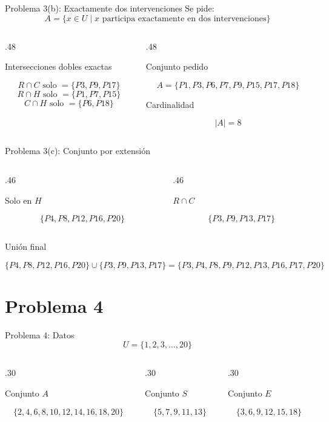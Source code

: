 \documentclass[aspectratio=169,11pt]{beamer}
\newcommand{\BloqueVisual}[2]{
	\begin{block}{#1}
		#2
	\end{block}
}
\begin{document}
	\begin{frame}{Problema 3(b): Exactamente dos intervenciones}
		Se pide:
		\[
		A=\{x\in U \mid x \text{ participa exactamente en dos intervenciones}\}
		\]
		
		\begin{columns}[T]
			\begin{column}{.48\textwidth}
				\BloqueVisual{Intersecciones dobles exactas}{
					\[
					R\cap C \text{ solo }=\{P3,P9,P17\}
					\]
					\[
					R\cap H \text{ solo }=\{P1,P7,P15\}
					\]
					\[
					C\cap H \text{ solo }=\{P6,P18\}
					\]
				}
			\end{column}
			\begin{column}{.48\textwidth}
				\BloqueVisual{Conjunto pedido}{
					\[
					A=\{P1,P3,P6,P7,P9,P15,P17,P18\}
					\]
				}
				\BloqueVisual{Cardinalidad}{
					\[
					|A|=8
					\]
				}
			\end{column}
		\end{columns}
	\end{frame}
	
	\begin{frame}{Problema 3(c): Conjunto por extensión}
		\begin{columns}[T]
			\begin{column}{.46\textwidth}
				\BloqueVisual{Solo en \(H\)}{
					\[
					\{P4,P8,P12,P16,P20\}
					\]
				}
			\end{column}
			\begin{column}{.46\textwidth}
				\BloqueVisual{\(R\cap C\)}{
					\[
					\{P3,P9,P13,P17\}
					\]
				}
			\end{column}
		\end{columns}
		
		\BloqueVisual{Unión final}{
			\[
			\{P4,P8,P12,P16,P20\}\cup \{P3,P9,P13,P17\}
			=
			\{P3,P4,P8,P9,P12,P13,P16,P17,P20\}
			\]
		}
	\end{frame}
	
	\section{Problema 4}
	
	\begin{frame}{Problema 4: Datos}
		\[
		U=\{1,2,3,\dots,20\}
		\]
		
		\begin{columns}[T]
			\begin{column}{.30\textwidth}
				\BloqueVisual{Conjunto \(A\)}{
					\[
					\{2,4,6,8,10,12,14,16,18,20\}
					\]
				}
			\end{column}
			\begin{column}{.30\textwidth}
				\BloqueVisual{Conjunto \(S\)}{
					\[
					\{5,7,9,11,13\}
					\]
				}
			\end{column}
			\begin{column}{.30\textwidth}
				\BloqueVisual{Conjunto \(E\)}{
					\[
					\{3,6,9,12,15,18\}
					\]
				}
			\end{column}
		\end{columns}
	\end{frame}
	
\end{document}
